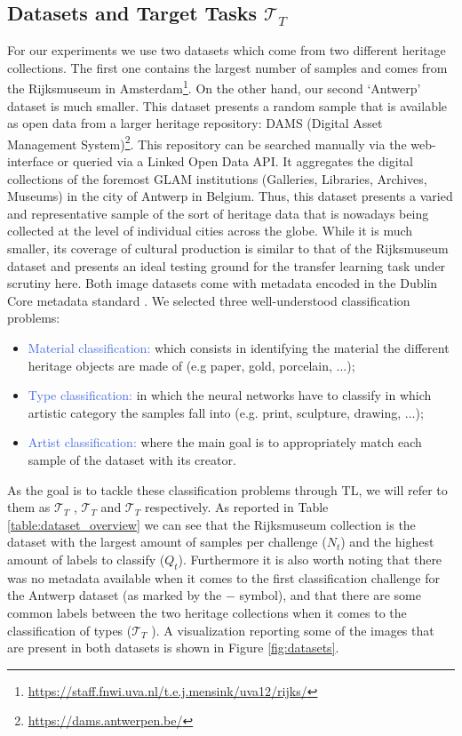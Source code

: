 \subsection{Datasets and Target Tasks $\mathcal{T}_T$}
\label{subsec:datasets}

For our experiments we use two datasets which come from two different heritage collections. The first one contains the largest number of samples and comes from the Rijksmuseum in Amsterdam\footnote{\url{https://staff.fnwi.uva.nl/t.e.j.mensink/uva12/rijks/}}. On the other hand, our second `Antwerp' dataset is much smaller. This dataset presents a random sample that is available as open data from a larger heritage repository: DAMS (Digital Asset Management System)\footnote{\url{https://dams.antwerpen.be/}}. This repository can be searched manually via the web-interface or queried via a Linked Open Data API. It aggregates the digital collections of the foremost GLAM institutions  (Galleries, Libraries, Archives, Museums) in the city of Antwerp in Belgium. Thus, this dataset presents a varied and representative sample of the sort of heritage data that is nowadays being collected at the level of individual cities across the globe. While it is much smaller, its coverage of cultural production is similar to that of the Rijksmuseum dataset and presents an ideal testing ground for the transfer learning task under scrutiny here. Both image datasets come with metadata encoded in the Dublin Core metadata standard \cite{weibel1998dublin}. We selected three well-understood classification problems:
\begin{itemize}
	\item \textcolor{RoyalBlue}{Material classification:} which consists in identifying the material the different heritage objects are made of (e.g paper, gold, porcelain, ...); 
	\item \textcolor{RoyalBlue}{Type classification:} in which the neural networks have to classify in which artistic category the samples fall into (e.g. print, sculpture, drawing, ...);
	\item \textcolor{RoyalBlue}{Artist classification:} where the main goal is to appropriately match each sample of the dataset with its creator.
\end{itemize}

As the goal is to tackle these classification problems through TL, we will refer to them as $\mathcal{T}_T$ , $\mathcal{T}_T$  and $\mathcal{T}_T$  respectively. As reported in Table \ref{table:dataset_overview} we can see that the Rijksmuseum collection is the dataset with the largest amount of samples per challenge ($N_t$) and the highest amount of labels to classify ($Q_t$). Furthermore it is also worth noting that there was no metadata available when it comes to the first classification challenge for the Antwerp dataset (as marked by the $-$ symbol), and that there are some common labels between the two heritage collections when it comes to the classification of types ($\mathcal{T}_T$ ). A visualization reporting some of the images that are present in both datasets is shown in Figure \ref{fig:datasets}.


